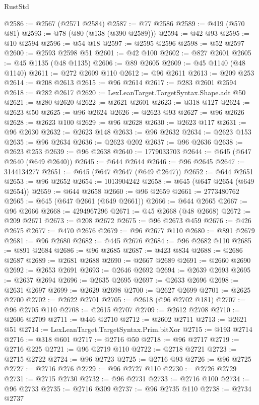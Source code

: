 \begin{lexlean}{RustStd}
\begin{coremodule}
{\begin{coremodule}
{{{{{{{{{{{{{{{{{{{{{{{{{{{{{{{{{{{{{{{{{{{{{{{{{{{{{{{{{{{{@2586 := @2567 (@2571 @2584)
@2587 := @77 @2586
@2589 := @419 (@570 @81)
@2593 := @78 (@80 (@138 (@390 @2589)))
@2594 := @42 @93
@2595 := @10 @2594
@2596 := @54 @18
@2597 := @2595 @2596
@2598 := @52 @2597
@2600 := @2593 @2598 @51
@2601 := @42 @100
@2602 := @827 @2601
@2605 := @45 @1135 (@48 @1135)
@2606 := @89 @2605
@2609 := @45 @1140 (@48 @1140)
@2611 := @272 @2609 @110
@2612 := @96 @2611
@2613 := @209 @253
@2614 := @208 @2613
@2615 := @96 @2614
@2617 := @283 @2601 @2594
@2618 := @282 @2617
@2620 := LexLeanTarget.TargetSyntax.Shape.adt @50
@2621 := @280 @2620
@2622 := @2621 @2601
@2623 := @318 @127
@2624 := @2623 @50
@2625 := @96 @2624
@2626 := @2623 @93
@2627 := @96 @2626
@2628 := @2623 @100
@2629 := @96 @2628
@2630 := @2623 @117
@2631 := @96 @2630
@2632 := @2623 @148
@2633 := @96 @2632
@2634 := @2623 @153
@2635 := @96 @2634
@2636 := @2623 @202
@2637 := @96 @2636
@2638 := @2623 @253
@2639 := @96 @2638
@2640 := 1779033703
@2644 := @645 (@647 @2640 (@649 @2640))
@2645 := @644 @2644
@2646 := @96 @2645
@2647 := 3144134277
@2651 := @645 (@647 @2647 (@649 @2647))
@2652 := @644 @2651
@2653 := @96 @2652
@2654 := 1013904242
@2658 := @645 (@647 @2654 (@649 @2654))
@2659 := @644 @2658
@2660 := @96 @2659
@2661 := 2773480762
@2665 := @645 (@647 @2661 (@649 @2661))
@2666 := @644 @2665
@2667 := @96 @2666
@2668 := 4294967296
@2671 := @45 @2668 (@48 @2668)
@2672 := @209 @2671
@2673 := @208 @2672
@2675 := @96 @2673 @459
@2676 := @426 @2675
@2677 := @470 @2676
@2679 := @96 @2677 @110
@2680 := @891 @2679
@2681 := @96 @2680
@2682 := @445 @2676
@2684 := @96 @2682 @110
@2685 := @891 @2684
@2686 := @96 @2685
@2687 := @423 @834
@2688 := @2686 @2687
@2689 := @2681 @2688
@2690 := @2667 @2689
@2691 := @2660 @2690
@2692 := @2653 @2691
@2693 := @2646 @2692
@2694 := @2639 @2693
@2695 := @2637 @2694
@2696 := @2635 @2695
@2697 := @2633 @2696
@2698 := @2631 @2697
@2699 := @2629 @2698
@2700 := @2627 @2699
@2701 := @2625 @2700
@2702 := @2622 @2701
@2705 := @2618 (@96 @2702 @181)
@2707 := @96 @2705 @110
@2708 := @2615 @2707
@2709 := @2612 @2708
@2710 := @2606 @2709
@2711 := @446 @2710
@2712 := @2602 @2711
@2713 := @2621 @51
@2714 := LexLeanTarget.TargetSyntax.Prim.bitXor
@2715 := @193 @2714
@2716 := @318 @601
@2717 := @2716 @50
@2718 := @96 @2717
@2719 := @2716 @225
@2721 := @96 @2719 @110
@2722 := @2718 @2721
@2723 := @2715 @2722
@2724 := @96 @2723
@2725 := @2716 @93
@2726 := @96 @2725
@2727 := @2716 @276
@2729 := @96 @2727 @110
@2730 := @2726 @2729
@2731 := @2715 @2730
@2732 := @96 @2731
@2733 := @2716 @100
@2734 := @96 @2733
@2735 := @2716 @309
@2737 := @96 @2735 @110
@2738 := @2734 @2737
}}}}}}}}}}}}}}}}}}}}}}}}}}}}}}}}}}}}}}}}}}}}}}}}}}}}}}}}}}}}
\end{coremodule}}
\end{coremodule}
\end{lexlean}
